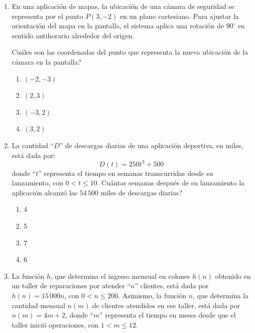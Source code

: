 \documentclass[11pt]{article}
\newcommand{\opcion}[2]{\item $#2$}
\begin{document}
\begin{enumerate}[label=\textbf{\arabic*.}, itemsep=2.5cm]
\begin{enumerate}[label=\Alph*)]
  \item $2$
  \item $6$
  \item $\dfrac{1}{2}$
  \item $\dfrac{1}{3}$
\end{enumerate}

\Needspace{0.48\textheight}
\item
En una aplicaci\'on de mapas, la ubicaci\'on de una c\'amara de seguridad se representa por el punto $P(3,-2)$ en un plano cartesiano. Para ajustar la orientaci\'on del mapa en la pantalla, el sistema aplica una rotaci\'on de $90^{\circ}$ en sentido antihorario alrededor del origen.

\textquestiondown Cu\'ales son las coordenadas del punto que representa la nueva ubicaci\'on de la c\'amara en la pantalla?

\begin{enumerate}[label=\Alph*)]
  \opcion{A}{(-2,-3)}
  \opcion{B}{(2,3)}
  \opcion{C}{(-3,2)}
  \opcion{D}{(3,2)}
\end{enumerate}


\Needspace{0.52\textheight}
\item
La cantidad ``$D$'' de descargas diarias de una aplicaci\'on deportiva, en miles, est\'a dada por:
\[D(t) = 250t^3 + 500\]
donde ``$t$'' representa el tiempo en semanas transcurridas desde su lanzamiento, con $0 < t \leq 10$. \textquestiondown Cu\'antas semanas despu\'es de su lanzamiento la aplicaci\'on alcanz\'o las $54\,500$ miles de descargas diarias?

\begin{enumerate}[label=\Alph*)]
  \item 4
  \item 5
  \item 7
  \opcion{D}{6}
\end{enumerate}

\Needspace{0.58\textheight}
\item
La funci\'on $h$, que determina el ingreso mensual en colones $h(n)$ obtenido en un taller de reparaciones por atender ``$n$'' clientes, est\'a dada por $h(n) = 15\,000n$, con $0 < n \leq 200$. Asimismo, la funci\'on $n$, que determina la cantidad mensual $n(m)$ de clientes atendidos en ese taller, est\'a dada por $n(m) = 4m + 2$, donde ``$m$'' representa el tiempo en meses desde que el taller inici\'o operaciones, con $1 < m \leq 12$.


\end{enumerate}
\end{document}
